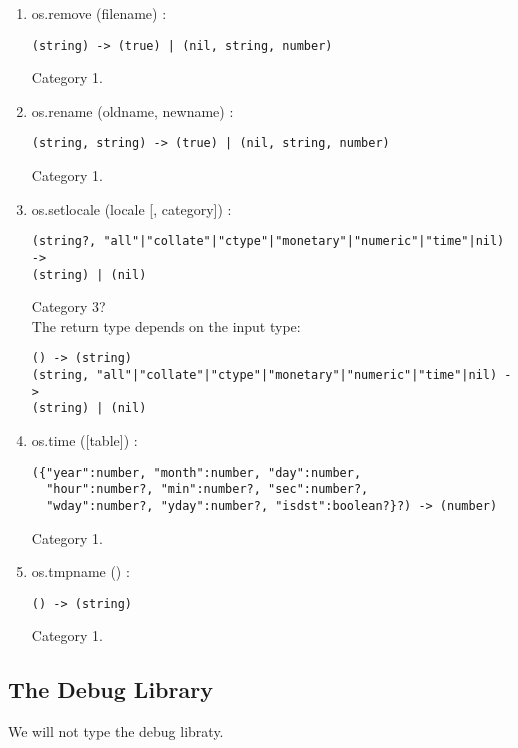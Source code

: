 \documentclass{paper}
\begin{document}
\begin{enumerate}
\begin{verbatim}
(string) -> (string?)
\end{verbatim}
Category 1.
\item os.remove (filename) :
\begin{verbatim}
(string) -> (true) | (nil, string, number)
\end{verbatim}
Category 1.
\item os.rename (oldname, newname) :
\begin{verbatim}
(string, string) -> (true) | (nil, string, number)
\end{verbatim}
Category 1.
\item os.setlocale (locale [, category]) :
\begin{verbatim}
(string?, "all"|"collate"|"ctype"|"monetary"|"numeric"|"time"|nil) ->
(string) | (nil)
\end{verbatim}
Category 3?
\\
The return type depends on the input type:
\begin{verbatim}
() -> (string)
(string, "all"|"collate"|"ctype"|"monetary"|"numeric"|"time"|nil) ->
(string) | (nil)
\end{verbatim}
\item os.time ([table]) :
\begin{verbatim}
({"year":number, "month":number, "day":number,
  "hour":number?, "min":number?, "sec":number?,
  "wday":number?, "yday":number?, "isdst":boolean?}?) -> (number)
\end{verbatim}
Category 1.
\item os.tmpname () :
\begin{verbatim}
() -> (string)
\end{verbatim}
Category 1.
\end{enumerate}

\subsection{The Debug Library}

We will not type the debug libraty.
\end{document}

